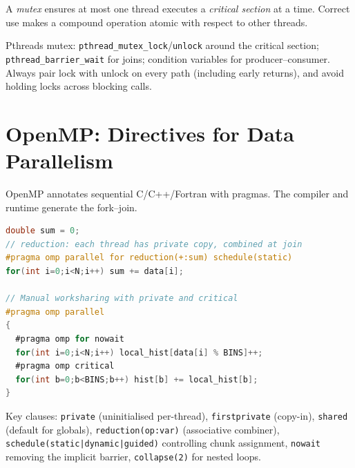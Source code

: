 \begin{definition}\label{def:mutex}
A \textit{mutex} ensures at most one thread executes a \textit{critical section} at a time. Correct use makes a compound operation atomic with respect to other threads.
\end{definition}

Pthreads mutex: \texttt{pthread\_mutex\_lock}/\texttt{unlock} around the critical section; \texttt{pthread\_barrier\_wait} for joins; condition variables for producer--consumer. Always pair lock with unlock on every path (including early returns), and avoid holding locks across blocking calls.

\section{OpenMP: Directives for Data Parallelism}
OpenMP annotates sequential C/C++/Fortran with pragmas. The compiler and runtime generate the fork--join.

\begin{lstlisting}[language=C, caption={OpenMP: correct reductions, worksharing, and private variables}, label={lst:openmp}]
double sum = 0;
// reduction: each thread has private copy, combined at join
#pragma omp parallel for reduction(+:sum) schedule(static)
for(int i=0;i<N;i++) sum += data[i];

// Manual worksharing with private and critical
#pragma omp parallel
{
  #pragma omp for nowait
  for(int i=0;i<N;i++) local_hist[data[i] % BINS]++;
  #pragma omp critical
  for(int b=0;b<BINS;b++) hist[b] += local_hist[b];
}
\end{lstlisting}

Key clauses: \texttt{private} (uninitialised per-thread), \texttt{firstprivate} (copy-in), \texttt{shared} (default for globals), \texttt{reduction(op:var)} (associative combiner), \texttt{schedule(static|dynamic|guided)} controlling chunk assignment, \texttt{nowait} removing the implicit barrier, \texttt{collapse(2)} for nested loops.

